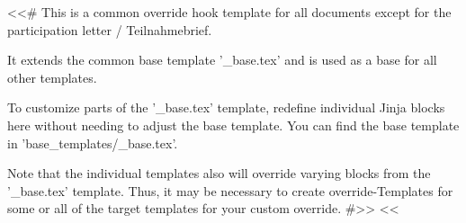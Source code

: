 <<# This is a common override hook template for all documents except for the participation letter / Teilnahmebrief.

    It extends the common base template '_base.tex' and is used as a base for all other templates.

    To customize parts of the '_base.tex' template, redefine individual Jinja blocks here without needing to
    adjust the base template. You can find the base template in 'base_templates/_base.tex'.

    Note that the individual templates also will override varying blocks from the '_base.tex' template. Thus, it
    may be necessary to create override-Templates for some or all of the target templates for your custom override.
#>>
<<%
